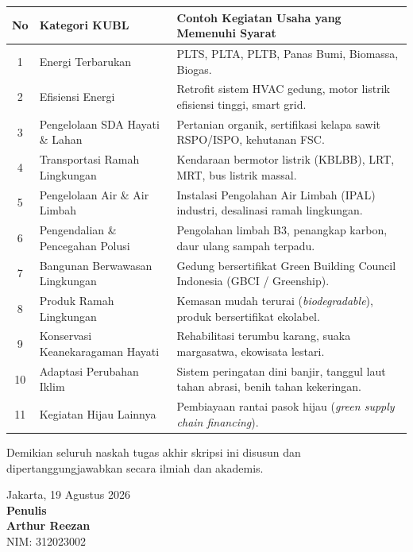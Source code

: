 \documentclass[12pt,a4paper]{article}
\newcommand{\nahamahasiswa}{Arthur Reezan}
\newcommand{\nim}{312023002}
\numberwithin{equation}{section}
\begin{document}
\vspace{0.3cm}
\begin{table}[H]
  \small
  \begin{tabularx}{\textwidth}{|c|>{\raggedright\arraybackslash}p{3.8cm}|X|}
    \hline
    \textbf{No} & \textbf{Kategori KUBL} & \textbf{Contoh Kegiatan Usaha yang Memenuhi Syarat} \\
    \hline
    1 & Energi Terbarukan & PLTS, PLTA, PLTB, Panas Bumi, Biomassa, Biogas. \\
    2 & Efisiensi Energi & Retrofit sistem HVAC gedung, motor listrik efisiensi tinggi, smart grid. \\
    3 & Pengelolaan SDA Hayati \& Lahan & Pertanian organik, sertifikasi kelapa sawit RSPO/ISPO, kehutanan FSC. \\
    4 & Transportasi Ramah Lingkungan & Kendaraan bermotor listrik (KBLBB), LRT, MRT, bus listrik massal. \\
    5 & Pengelolaan Air \& Air Limbah & Instalasi Pengolahan Air Limbah (IPAL) industri, desalinasi ramah lingkungan. \\
    6 & Pengendalian \& Pencegahan Polusi & Pengolahan limbah B3, penangkap karbon, daur ulang sampah terpadu. \\
    7 & Bangunan Berwawasan Lingkungan & Gedung bersertifikat Green Building Council Indonesia (GBCI / Greenship). \\
    8 & Produk Ramah Lingkungan & Kemasan mudah terurai (\emph{biodegradable}), produk bersertifikat ekolabel. \\
    9 & Konservasi Keanekaragaman Hayati & Rehabilitasi terumbu karang, suaka margasatwa, ekowisata lestari. \\
    10 & Adaptasi Perubahan Iklim & Sistem peringatan dini banjir, tanggul laut tahan abrasi, benih tahan kekeringan. \\
    11 & Kegiatan Hijau Lainnya & Pembiayaan rantai pasok hijau (\emph{green supply chain financing}). \\
    \hline
  \end{tabularx}
\end{table}

\vspace{0.5cm}
\noindent
Demikian seluruh naskah tugas akhir skripsi ini disusun dan dipertanggungjawabkan secara ilmiah dan akademis.

\vspace{0.8cm}
\begin{flushright}
  Jakarta, 19 Agustus 2026\\[0.3cm]
  \textbf{Penulis}\\[1.8cm]
  \textbf{\nahamahasiswa}\\
  NIM: \nim
\end{flushright}
\end{document}
